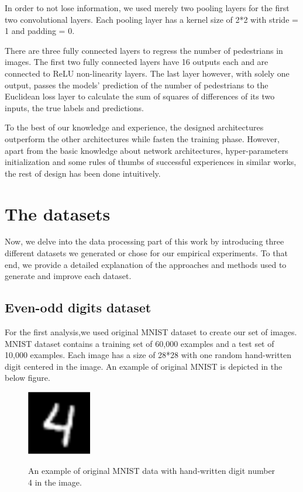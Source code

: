 \indent In order to not lose information, we used merely two pooling layers for the first two convolutional layers. Each pooling layer has a kernel size of 2*2 with stride = 1 and padding = 0. 

There are three fully connected layers to regress the number of pedestrians in images. The first two fully connected layers have 16 outputs each and are connected to ReLU non-linearity layers. The last layer however, with solely one output, passes the models' prediction of the number of pedestrians to the Euclidean loss layer to calculate the sum of squares of differences of its two inputs, the true labels and predictions.  

To the best of our knowledge and experience, the designed architectures outperform the other architectures while fasten the training phase. However, apart from the basic knowledge about network architectures, hyper-parameters initialization and some rules of thumbs of successful experiences in similar works, the rest of design has been done intuitively.

\section{The datasets}

Now, we delve into the data processing part of this work by introducing three different datasets we generated or chose for our empirical experiments. To that end, we provide a detailed explanation of the approaches and methods used to generate and improve each dataset.

\subsection{Even-odd digits dataset}

For the first analysis,we used original MNIST dataset \cite{lecun1998mnist} to create our set of images. MNIST dataset contains a training set of 60,000 examples and a test set of 10,000 examples. Each image has a size of 28*28 with one random hand-written digit centered in the image. 
An example of original MNIST is depicted in the below figure.

\begin{figure}[H]
	\centering
	{\includegraphics[width=0.25\textwidth]{images/mnist}}
		\caption{An example of original MNIST data with hand-written digit number 4 in the image. }
	\label{fig:mnist}
\end{figure}

